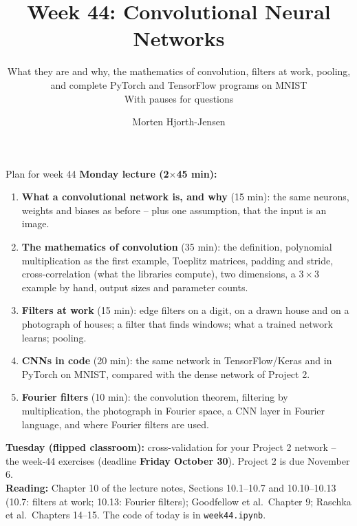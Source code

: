 \documentclass[10pt,aspectratio=169]{beamer}
\title{Week 44: Convolutional Neural Networks}
\subtitle{What they are and why, the mathematics of convolution, filters at
  work, pooling, and complete PyTorch and TensorFlow programs on MNIST\\[3pt]
  \small With pauses for questions}
\author{Morten Hjorth-Jensen}
\institute{Department of Physics and Center for Computing in Science Education,\\
  University of Oslo, Norway}
\date{}
\begin{document}
\begin{frame}
\titlepage
\end{frame}

\begin{frame}{Plan for week 44}
\small
\textbf{Monday lecture (2$\times$45 min):}
\begin{enumerate}
  \item \textbf{What a convolutional network is, and why} (15 min): the
        same neurons, weights and biases as before -- plus one assumption,
        that the input is an image.
  \item \textbf{The mathematics of convolution} (35 min): the definition,
        polynomial multiplication as the first example, Toeplitz matrices,
        padding and stride, cross-correlation (what the libraries compute),
        two dimensions, a $3\times3$ example by hand, output sizes and
        parameter counts.
  \item \textbf{Filters at work} (15 min): edge filters on a digit, on a
        drawn house and on a photograph of houses; a filter that finds
        windows; what a trained network learns; pooling.
  \item \textbf{CNNs in code} (20 min): the same network in TensorFlow/Keras
        and in PyTorch on MNIST, compared with the dense network of Project 2.
  \item \textbf{Fourier filters} (10 min): the convolution theorem, filtering
        by multiplication, the photograph in Fourier space, a CNN layer in
        Fourier language, and where Fourier filters are used.
\end{enumerate}
\textbf{Tuesday (flipped classroom):} cross-validation for your Project 2
network -- the week-44 exercises (deadline \textbf{Friday October 30}).
Project 2 is due November 6.\\[3pt]
\textbf{Reading:} Chapter 10 of the lecture notes, Sections 10.1--10.7 and
10.10--10.13 (10.7: filters at work; 10.13: Fourier filters); Goodfellow et
al.\ Chapter 9; Raschka et al.\ Chapters 14--15.
The code of today is in \texttt{week44.ipynb}.
\end{frame}

\end{document}
